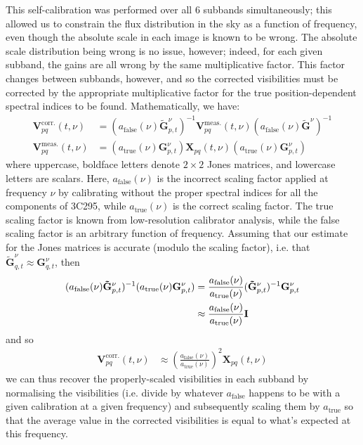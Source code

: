 \pg
This self-calibration was performed over all 6 subbands simultaneously; this allowed us to constrain the flux distribution in the sky as a function of frequency, even though the absolute scale in each image is known to be wrong. The absolute scale distribution being wrong is no issue, however; indeed, for each given subband, the gains are all wrong by the same multiplicative factor. This factor changes between subbands, however, and so the corrected visibilities must be corrected by the appropriate multiplicative factor for the true position-dependent spectral indices to be found. Mathematically, we have:
\begin{align}
\mathbf{V}_{pq}^\mathrm{corr.}(t,\nu) &= (a_\mathrm{false}(\nu) \mathbf{\tilde{G}}_{p,t}^{\nu})^{-1}{\mathbf{V}_{pq}^\mathrm{meas.}(t,\nu) }{(a_\mathrm{false}(\nu) \mathbf{\tilde{G}}^{\nu})^{-1}}\\
\mathbf{V}_{pq}^\mathrm{meas.}(t,\nu) &=(a_\mathrm{true}(\nu) \mathbf{{G}}_{p,t}^{\nu}) \mathbf{X}_{pq}(t,\nu) (a_\mathrm{true}(\nu) \mathbf{{G}}_{p,t}^{\nu}) %
\end{align}
where uppercase, boldface letters denote $2\times 2$ Jones matrices, and lowercase letters are scalars. Here, $a_\mathrm{false}(\nu)$ is the incorrect scaling factor applied at frequency $\nu$ by calibrating without the proper spectral indices for all the components of 3C295, while $a_\mathrm{true}(\nu)$ is the correct scaling factor. The true scaling factor is known from low-resolution calibrator analysis, while the false scaling factor is an arbitrary function of frequency.
Assuming that our estimate for the Jones matrices is accurate (modulo the scaling factor), i.e. that $\mathbf{\tilde{G}}_{q,t}^{\nu}\approx \mathbf{{G}}_{q,t}^{\nu}$, then 
\begin{align}
(a_\mathrm{false}(\nu) \mathbf{\tilde{G}}_{p,t}^{\nu})^{-1}(a_\mathrm{true}(\nu) \mathbf{{G}}_{p,t}^{\nu}) &= \frac{a_\mathrm{false}(\nu)}{a_\mathrm{true}(\nu)} (\mathbf{\tilde{G}}_{p,t}^{\nu})^{-1}\mathbf{{G}}_{p,t}^{\nu}\\
&\approx \frac{a_\mathrm{false}(\nu)}{a_\mathrm{true}(\nu)} \bm{\mathrm{I}}
\end{align}
and so
\begin{align}
\mathbf{V}_{pq}^\mathrm{corr.}(t,\nu) &\approx  \left(\frac{a_\mathrm{false}(\nu)}{a_\mathrm{true}(\nu)}\right)^2\mathbf{X}_{pq}(t,\nu)
\end{align}
we can thus recover the properly-scaled visibilities in each subband by normalising the visibilities (i.e. divide by whatever $a_\mathrm{false}$ happens to be with a given calibration at a given frequency) and subsequently scaling them by $a_\mathrm{true}$ so that the average value in the corrected visibilities is equal to what's expected at this frequency.

